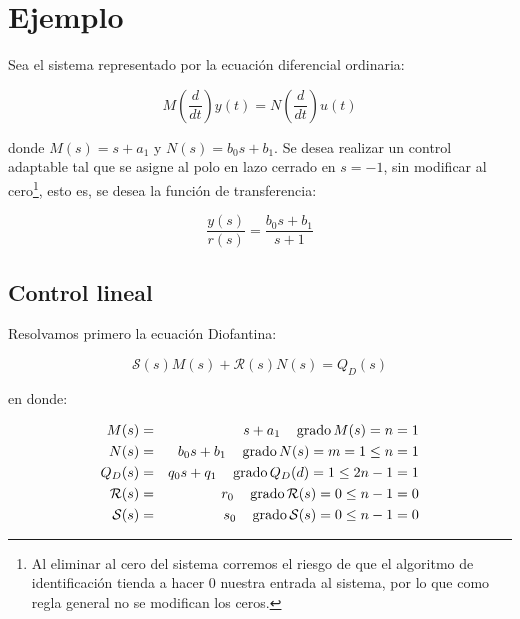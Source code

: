     \newpage
    \section{Ejemplo}

        Sea el sistema representado por la ecuación diferencial ordinaria:

        \begin{equation}
            M \left( \frac{d}{dt} \right) y(t) = N \left( \frac{d}{dt} \right) u(t)
        \end{equation}

        donde $M(s) = s + a_1$ y $N(s) = b_0 s + b_1$.
        Se desea realizar un control adaptable tal que se asigne al polo en lazo cerrado en $s = -1$, sin modificar al cero\footnote{Al eliminar al cero del sistema corremos el riesgo de que el algoritmo de identificación tienda a hacer $0$ nuestra entrada al sistema, por lo que como regla general no se modifican los ceros.}, esto es, se desea la función de transferencia:

        \begin{equation}
            \frac{y(s)}{r(s)} = \frac{b_0 s + b_1}{s + 1}
        \end{equation}

        \subsection{Control lineal}

            Resolvamos primero la ecuación Diofantina:

            \begin{equation*}
                \mathcal{S}(s) M(s) + \mathcal{R}(s) N(s) = Q_D(s)
            \end{equation*}

            en donde:

            \begin{eqnarray}
                M(s) & = & s + a_1 \quad \operatorname{grado}{M(s)} = n = 1 \\
                N(s) & = & b_0 s + b_1 \quad \operatorname{grado}{N(s)} = m = 1 \le n = 1 \\
                Q_D(s) & = & q_0 s + q_1 \quad \operatorname{grado}{Q_D(d)} = 1 \le 2n - 1 = 1 \\
                \mathcal{R}(s) & = & r_0 \quad \operatorname{grado}{\mathcal{R}(s)} = 0 \le n - 1 = 0 \\
                \mathcal{S}(s) & = & s_0 \quad \operatorname{grado}{\mathcal{S}(s)} = 0 \le n - 1 = 0
            \end{eqnarray}

